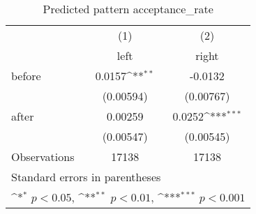 \begin{table}[htbp]\centering
\def\sym#1{\ifmmode^{#1}\else\(^{#1}\)\fi}
\caption{Predicted pattern acceptance\_rate}
\begin{tabular}{l*{2}{c}}
\hline\hline
                    &\multicolumn{1}{c}{(1)}&\multicolumn{1}{c}{(2)}\\
                    &\multicolumn{1}{c}{left}&\multicolumn{1}{c}{right}\\
\hline
before              &      0.0157\sym{**} &     -0.0132         \\
                    &   (0.00594)         &   (0.00767)         \\
[1em]
after               &     0.00259         &      0.0252\sym{***}\\
                    &   (0.00547)         &   (0.00545)         \\
\hline
Observations        &       17138         &       17138         \\
\hline\hline
\multicolumn{3}{l}{\footnotesize Standard errors in parentheses}\\
\multicolumn{3}{l}{\footnotesize \sym{*} \(p<0.05\), \sym{**} \(p<0.01\), \sym{***} \(p<0.001\)}\\
\end{tabular}
\end{table}
